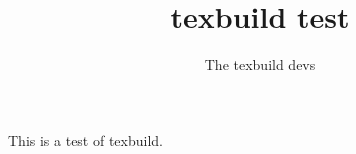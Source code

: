 \documentclass{article}
\author{The texbuild devs}
\title{texbuild test}
\begin{document}
\maketitle

This is a test of texbuild.


\end{document}
